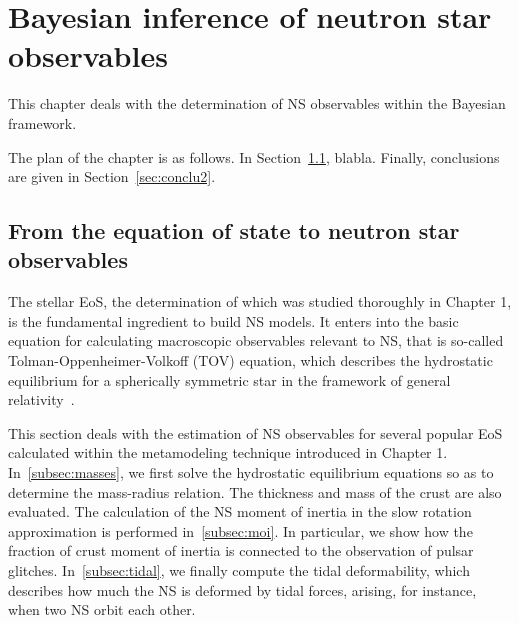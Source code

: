 %

\chapter{Bayesian inference of neutron star observables}

This chapter deals with the determination of NS observables within the Bayesian 
framework.

%   
%

The plan of the chapter is as follows. In Section~\ref{sec:tov}, blabla.
Finally, conclusions are given in Section~\ref{sec:conclu2}.

\minitoc\newpage

\section{From the equation of state to neutron star observables}\label{sec:tov}

The stellar EoS, the determination of which was studied thoroughly in Chapter 
1, is the fundamental ingredient to build NS models. It enters into the 
basic equation for calculating macroscopic observables relevant to NS, that is 
so-called Tolman-Oppenheimer-Volkoff (TOV) equation, which describes the 
hydrostatic equilibrium for a spherically symmetric star in the framework of 
general relativity~\cite{Tolman1939,Oppenheimer1939}.

This section deals with the estimation of NS observables for several 
popular EoS calculated within the metamodeling technique introduced in 
Chapter 1. In~\ref{subsec:masses}, we first solve the hydrostatic 
equilibrium equations so as to determine the mass-radius relation. The 
thickness and mass of the crust are also evaluated. The calculation of the NS 
moment of inertia in the slow rotation approximation is performed 
in~\ref{subsec:moi}. In particular, we show how the fraction of crust moment 
of inertia is connected to the 
observation of pulsar glitches. In~\ref{subsec:tidal}, we finally compute the 
tidal deformability, which describes how much the NS is deformed by tidal 
forces, arising, for instance, when two NS orbit each other.

